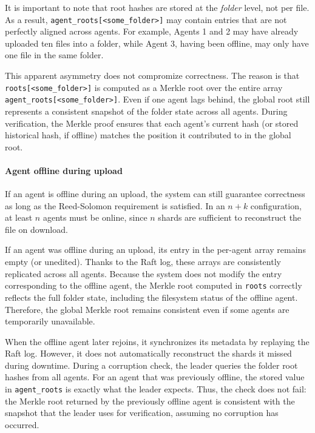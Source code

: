 It is important to note that root hashes are stored at the \emph{folder} level, not per file. As a result, \texttt{agent\_roots[<some\_folder>]} may contain entries that are not perfectly aligned across agents. For example, Agents 1 and 2 may have already uploaded ten files into a folder, while Agent 3, having been offline, may only have one file in the same folder.  

This apparent asymmetry does not compromize correctness. The reason is that \texttt{roots[<some\_folder>]} is computed as a Merkle root over the entire array \texttt{agent\_roots[<some\_folder>]}. Even if one agent lags behind, the global root still represents a consistent snapshot of the folder state across all agents. During verification, the Merkle proof ensures that each agent's current hash (or stored historical hash, if offline) matches the position it contributed to in the global root.  

\paragraph{Agent offline during upload}

If an agent is offline during an upload, the system can still guarantee correctness as long as the Reed-Solomon requirement is satisfied. In an $n+k$ configuration, at least $n$ agents must be online, since $n$ shards are sufficient to reconstruct the file on download.

If an agent was offline during an upload, its entry in the per-agent array remains empty (or unedited). Thanks to the Raft log, these arrays are consistently replicated across all agents. Because the system does not modify the entry corresponding to the offline agent, the Merkle root computed in \texttt{roots} correctly reflects the full folder state, including the filesystem status of the offline agent. Therefore, the global Merkle root remains consistent even if some agents are temporarily unavailable.

When the offline agent later rejoins, it synchronizes its metadata by replaying the Raft log. However, it does not automatically reconstruct the shards it missed during downtime. During a corruption check, the leader queries the folder root hashes from all agents. For an agent that was previously offline, the stored value in \texttt{agent\_roots} is exactly what the leader expects. Thus, the check does not fail: the Merkle root returned by the previously offline agent is consistent with the snapshot that the leader uses for verification, assuming no corruption has occurred.

